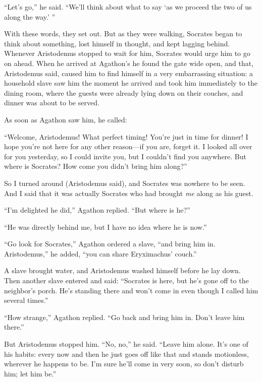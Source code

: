 “Let’s go,” he said. “We’ll think about what to say ‘as we proceed the
two of us along the way.’
”

With these words, they set out. But as they were walking, Socrates began
to think about something, lost himself in thought, and kept lagging
behind. Whenever Aristodemus stopped to wait for him, Socrates would
urge him  to go on ahead. When he arrived at Agathon’s he found
the gate wide open, and that, Aristodemus said, caused him to find
himself in a very embarrassing situation: a household slave saw him the
moment he arrived and took him immediately to the dining room, where the
guests were already lying down on their couches, and dinner was about to
be served.

As soon as Agathon saw him, he called:

“Welcome, Aristodemus! What perfect timing! You’re just in time for
dinner! I hope you’re not here for any other reason---if you are, forget
it. I looked all over for you yesterday, so I could invite you, but I
couldn’t find you anywhere. But where is Socrates? How come you didn’t
bring him along?”

So I turned around (Aristodemus said), and Socrates was nowhere to be
seen. And I said that it was actually Socrates who had brought {\em me}
along as his guest.

“I’m delighted he did,” Agathon replied. “But where is
he?”

“He was directly behind me, but I have no idea where he is now.”

“Go look for Socrates,” Agathon ordered a slave, “and bring him in.
Aristodemus,” he added, “you can share Eryximachus’ couch.”

A slave brought water, and Aristodemus washed himself before he lay
down. Then another slave entered and said: “Socrates is here, but he’s
gone off to the neighbor’s porch. He’s standing there and won’t come in
even though I called him several times.”

“How strange,” Agathon replied. “Go back and bring him in. Don’t leave
him there.”

But Aristodemus stopped him. “No, no,” he said. “Leave him alone. It’s 
one of his habits: every now and then he just goes off like that
and stands motionless, wherever he happens to be. I’m sure he’ll come in
very soon, so don’t disturb him; let him be.”

